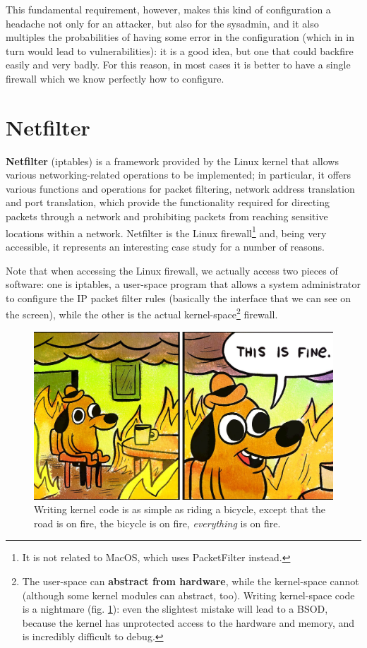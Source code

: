 This fundamental requirement, however, makes this kind of configuration a headache not only for an attacker, but also for the sysadmin, and it also multiples the probabilities of having some error in the configuration (which in in turn would lead to vulnerabilities): it is a good idea, but one that could backfire easily and very badly. For this reason, in most cases it is better to have a single firewall which we know perfectly how to configure.


\section{Netfilter}
\textbf{Netfilter} (iptables) is a framework provided by the Linux kernel that allows various networking-related operations to be implemented; in particular, it offers various functions and operations for packet filtering, network address translation and port translation, which provide the functionality required for directing packets through a network and prohibiting packets from reaching sensitive locations within a network. Netfilter is the Linux firewall\footnote{It is not related to MacOS, which uses PacketFilter instead.} and, being very accessible, it represents an interesting case study for a number of reasons.

Note that when accessing the Linux firewall, we actually access two pieces of software: one is iptables, a user-space program that allows a system administrator to configure the IP packet filter rules (basically the interface that we can see on the screen), while the other is the actual kernel-space\footnote{The user-space can \textbf{abstract from hardware}, while the kernel-space cannot (although some kernel modules can abstract, too). Writing kernel-space code is a nightmare (fig. \ref{fig:meme_this_is_fine_fw}): even the slightest mistake will lead to a BSOD, because the kernel has unprotected access to the hardware and memory, and is incredibly difficult to debug.} firewall.

\begin{figure}[h]
    \centering
    \includegraphics[scale=1]{img/this_is_fine.jpg}
    \decoRule
    \caption{Writing kernel code is as simple as riding a bicycle, except that the road is on fire, the bicycle is on fire, \textit{everything} is on fire.}
    \label{fig:meme_this_is_fine_fw}
\end{figure}

